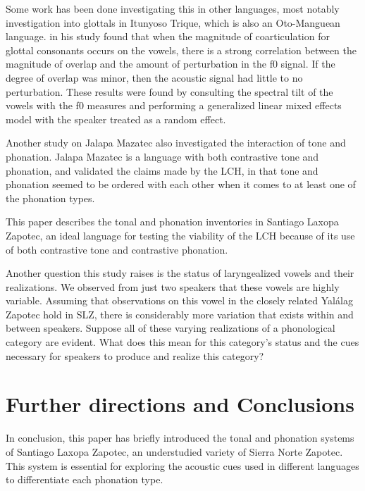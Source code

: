 \documentclass[12pt, letterpaper]{article}
\begin{document}
Some work has been done investigating this in other languages, most notably  investigation into glottals in Itunyoso Trique, which is also an Oto-Manguean language. \citeauthor{dicanioCoarticulationToneGlottal2012} in his study found that when the magnitude of coarticulation for glottal consonants occurs on the vowels, there is a strong correlation between the magnitude of overlap and the amount of perturbation in the f0 signal. If the degree of overlap was minor, then the acoustic signal had little to no perturbation. These results were found by consulting the spectral tilt of the vowels with the f0 measures and performing a generalized linear mixed effects model with the speaker treated as a random effect. 

Another study on Jalapa Mazatec \citep{garellekAcousticConsequencesPhonation2011} also investigated the interaction of tone and phonation. Jalapa Mazatec is a language with both contrastive tone and phonation, and \citet{garellekAcousticConsequencesPhonation2011} validated the claims made by the LCH, in that tone and phonation seemed to be ordered with each other when it comes to at least one of the phonation types. 

This paper describes the tonal and phonation inventories in Santiago Laxopa Zapotec, an ideal language for testing the viability of the LCH because of its use of both contrastive tone and contrastive phonation.   

Another question this study raises is the status of laryngealized vowels and their realizations. We observed from just two speakers that these vowels are highly variable. Assuming that  observations on this vowel in the closely related Yalálag Zapotec hold in SLZ, there is considerably more variation that exists within and between speakers. Suppose all of these varying realizations of a phonological category are evident. What does this mean for this category's status and the cues necessary for speakers to produce and realize this category? 

\section{Further directions and Conclusions} \label{sec:Conclusion}

In conclusion, this paper has briefly introduced the tonal and phonation systems of Santiago Laxopa Zapotec, an understudied variety of Sierra Norte Zapotec. This system is essential for exploring the acoustic cues used in different languages to differentiate each phonation type.
\end{document}
